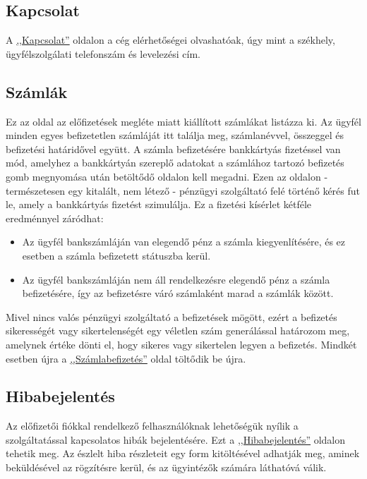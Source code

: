 \documentclass[centeredchapter]{thesis-ekf}
\theoremstyle{definition}
\theoremstyle{remark}
\begin{document}
\subsection{Kapcsolat}\hypertarget{leiras-kapcsolat}{}

A \hyperlink{leiras-kapcsolat}{,,Kapcsolat''} oldalon a cég elérhetőségei olvashatóak, úgy mint a székhely, ügyfélszolgálati telefonszám és levelezési cím.

\subsection{Számlák}\hypertarget{leiras-szamla}{}

Ez az oldal az előfizetések megléte miatt kiállított számlákat listázza ki. Az ügyfél minden egyes befizetetlen számláját itt találja meg, számlanévvel, összeggel és befizetési határidővel együtt. A számla befizetésére bankkártyás fizetéssel van mód, amelyhez a bankkártyán szereplő adatokat a számlához tartozó befizetés gomb megnyomása után betöltődő oldalon kell megadni. Ezen az oldalon - természetesen egy kitalált, nem létező - pénzügyi szolgáltató felé történő kérés fut le, amely a bankkártyás fizetést szimulálja. Ez a fizetési kísérlet kétféle eredménnyel záródhat:
\begin{itemize}
	\item  Az ügyfél bankszámláján van elegendő pénz a számla kiegyenlítésére, és ez esetben a számla befizetett státuszba kerül.
	\item Az ügyfél bankszámláján nem áll rendelkezésre elegendő pénz a számla befizetésére, így az befizetésre váró számlaként marad a számlák között.
\end{itemize}

 Mivel nincs valós pénzügyi szolgáltató a befizetések mögött, ezért a befizetés sikerességét vagy sikertelenségét egy véletlen szám generálással határozom meg, amelynek értéke dönti el, hogy sikeres vagy sikertelen legyen a befizetés. Mindkét esetben újra a \hyperlink{leiras-szamla}{,,Számlabefizetés''} oldal töltődik be újra.

\subsection{Hibabejelentés}\hypertarget{leiras-bejelentes}{}

Az előfizetői fiókkal rendelkező felhasználóknak lehetőségük nyílik a szolgáltatással kapcsolatos hibák bejelentésére. Ezt a \hyperlink{leiras-bejelentes}{,,Hibabejelentés''} oldalon tehetik meg.
Az észlelt hiba részleteit egy form kitöltésével adhatják meg, aminek beküldésével az rögzítésre kerül, és az ügyintézők számára láthatóvá válik.
\end{document}
